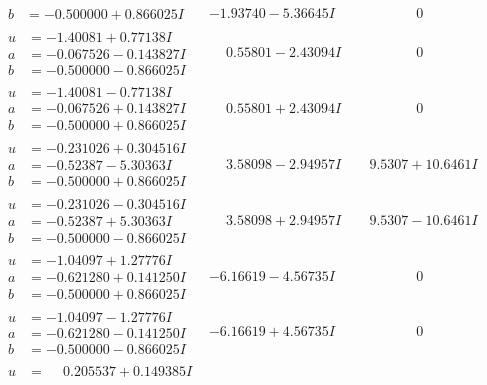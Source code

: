 \documentclass[1p]{elsarticle_modified}
\theoremstyle{definition}
\begin{document}
$$\begin{array}{c|c|c}
\begin{aligned}
b &= -0.500000 + 0.866025 I\end{aligned}
 & -1.93740 - 5.36645 I & \phantom{-0.000000 } 0 \\ \hline\begin{aligned}
u &= -1.40081 + 0.77138 I \\
a &= -0.067526 - 0.143827 I \\
b &= -0.500000 - 0.866025 I\end{aligned}
 & \phantom{-}0.55801 - 2.43094 I & \phantom{-0.000000 } 0 \\ \hline\begin{aligned}
u &= -1.40081 - 0.77138 I \\
a &= -0.067526 + 0.143827 I \\
b &= -0.500000 + 0.866025 I\end{aligned}
 & \phantom{-}0.55801 + 2.43094 I & \phantom{-0.000000 } 0 \\ \hline\begin{aligned}
u &= -0.231026 + 0.304516 I \\
a &= -0.52387 - 5.30363 I \\
b &= -0.500000 + 0.866025 I\end{aligned}
 & \phantom{-}3.58098 - 2.94957 I & \phantom{-}9.5307 + 10.6461 I \\ \hline\begin{aligned}
u &= -0.231026 - 0.304516 I \\
a &= -0.52387 + 5.30363 I \\
b &= -0.500000 - 0.866025 I\end{aligned}
 & \phantom{-}3.58098 + 2.94957 I & \phantom{-}9.5307 - 10.6461 I \\ \hline\begin{aligned}
u &= -1.04097 + 1.27776 I \\
a &= -0.621280 + 0.141250 I \\
b &= -0.500000 + 0.866025 I\end{aligned}
 & -6.16619 - 4.56735 I & \phantom{-0.000000 } 0 \\ \hline\begin{aligned}
u &= -1.04097 - 1.27776 I \\
a &= -0.621280 - 0.141250 I \\
b &= -0.500000 - 0.866025 I\end{aligned}
 & -6.16619 + 4.56735 I & \phantom{-0.000000 } 0 \\ \hline\begin{aligned}
u &= \phantom{-}0.205537 + 0.149385 I \\

\end{aligned}
\end{array}$$
\end{document}
